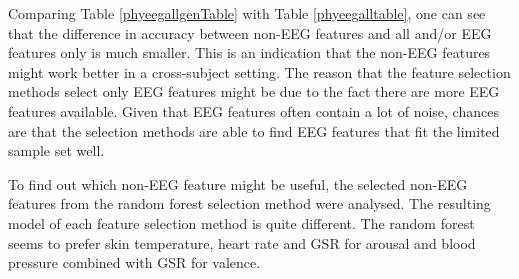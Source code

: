 Comparing Table \ref{phyeegallgenTable} with Table \ref{phyeegalltable}, one can see that the difference in accuracy between non-EEG features and all and/or EEG features only is much smaller. This is an indication that the non-EEG features might work better in a cross-subject setting. The reason that the feature selection methods select only EEG features might be due to the fact there are more EEG features available. Given that EEG features often contain a lot of noise, chances are that the selection methods are able to find EEG features that fit the limited sample set well. 

\npar

To find out which non-EEG feature might be useful, the selected non-EEG features from the random forest selection method were analysed. The resulting model of each feature selection method is quite different. The random forest seems to prefer skin temperature, heart rate and GSR for arousal and blood pressure combined with GSR for valence.

\clearpage

